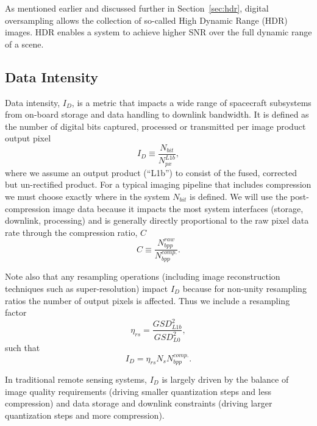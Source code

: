 \documentclass[10pt,journal]{IEEEtran}  %
\begin{document}
As mentioned earlier and discussed further in Section~\ref{sec:hdr}, digital oversampling allows the collection of so-called High Dynamic Range (HDR) images.  HDR enables a system to achieve higher SNR over the full dynamic range of a scene.

\subsection{Data Intensity}
\label{sec:data_intensity}
Data intensity, $I_D$, is a metric that impacts a wide range of spacecraft subsystems from on-board storage and data handling to downlink bandwidth.  It is defined as the number of digital bits captured, processed or transmitted per image product output pixel
\begin{equation}
    I_D \equiv \frac{N_{bit}}{N_{px}^{L1b}},
\end{equation}
where we assume an output product (``L1b'') to consist of the fused, corrected but un-rectified product. For a typical imaging pipeline that includes compression we must choose exactly where in the system $N_{bit}$ is defined.  We will use the post-compression image data because it impacts the most system interfaces (storage, downlink, processing) and is generally directly proportional to the raw pixel data rate through the compression ratio, $C$
\begin{equation*}
    \label{eq:compression}
    C \equiv \frac{N_{bpp}^{raw}}{N_{bpp}^{comp.}}.
\end{equation*}

Note also that any resampling operations (including image reconstruction techniques such as super-resolution) impact $I_D$ because for non-unity resampling ratios the number of output pixels is affected.  Thus we include a resampling factor
\begin{equation*}
    \eta_{rs} = \frac{GSD_{L1b}^2}{GSD_{L0}^2},
\end{equation*}
such that
\begin{equation}
    \label{eq:I_D}
    I_D = {\eta}_{rs} N_s N_{bpp}^{comp.}.
\end{equation}

In traditional remote sensing systems, $I_D$ is largely driven by the balance of image quality requirements (driving smaller quantization steps and less compression) and data storage and downlink constraints (driving larger quantization steps and more compression).
\end{document}
